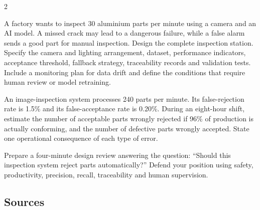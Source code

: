 \begin{multicols}{2}
\begin{engineeringchallenge}
A factory wants to inspect 30 aluminium parts per minute using a camera and an AI model. A missed crack may lead to a dangerous failure, while a false alarm sends a good part for manual inspection. Design the complete inspection station. Specify the camera and lighting arrangement, dataset, performance indicators, acceptance threshold, fallback strategy, traceability records and validation tests. Include a monitoring plan for data drift and define the conditions that require human review or model retraining.
\end{engineeringchallenge}

\begin{applicationexercise}
An image-inspection system processes 240 parts per minute. Its false-rejection rate is 1.5\% and its false-acceptance rate is 0.20\%. During an eight-hour shift, estimate the number of acceptable parts wrongly rejected if 96\% of production is actually conforming, and the number of defective parts wrongly accepted. State one operational consequence of each type of error.
\end{applicationexercise}

\begin{speaking}
Prepare a four-minute design review answering the question: ``Should this inspection system reject parts automatically?'' Defend your position using safety, productivity, precision, recall, traceability and human supervision.
\end{speaking}
\end{multicols}

\subsection*{Sources}
